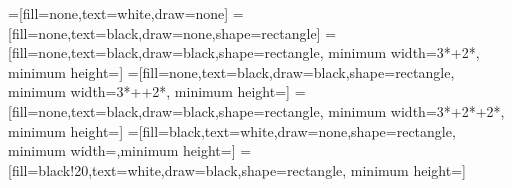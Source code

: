 \let\workinterval\relax
\let\ckpttime\relax
\let\txdelay\relax
\let\msgtime\relax
\let\minheight\relax
\newcommand{\workinterval}{1.25cm}
\newcommand{\ckpttime}{0.625cm}
\newcommand{\txdelay}{2.0mm}
\newcommand{\msgtime}{\workinterval+\txdelay}
\newcommand{\minheight}{0.5cm}
\usetikzlibrary{positioning}

=[fill=none,text=white,draw=none]
=[fill=none,text=black,draw=none,shape=rectangle]
=[fill=none,text=black,draw=black,shape=rectangle,
                       minimum width=3*\workinterval+2*\txdelay,
                       minimum height=\minheight]
=[fill=none,text=black,draw=black,shape=rectangle,
                        minimum width=3*\workinterval+\ckpttime+2*\txdelay,
                        minimum height=\minheight]
=[fill=none,text=black,draw=black,shape=rectangle,
                          minimum width=3*\workinterval+2*\ckpttime+2*\txdelay,
                          minimum height=\minheight]
=[fill=black,text=white,draw=none,shape=rectangle,
                  minimum width=\ckpttime,minimum height=\minheight]
=[fill=black!20,text=white,draw=black,shape=rectangle,
                   minimum height=\minheight]


